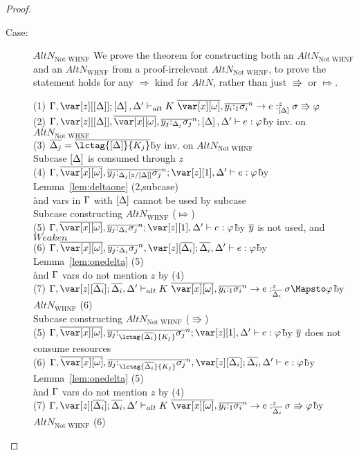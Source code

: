 \begin{proof}
\begin{description}
\item[Case:] $AltN_{\textrm{Not WHNF}}$
    We prove the theorem for constructing both an $AltN_{\textrm{Not WHNF}}$
        and an $AltN_{\textrm{WHNF}}$ from a proof-irrelevant $AltN_{\textrm{Not
        WHNF}}$, to prove the statement holds for any $\Rightarrow$ kind for
        $AltN$, rather than just $\Rrightarrow$ or $\Mapsto$.
\begin{tabbing}
    (1) $\G, \z[\irr{\D}]; \irr{\D}, \D' \vdash_{alt} K~\ov{\xo},\ov{y_i{:}_{1}\s_i}^n\to e :^z_{\irr{\D}} \s \Rrightarrow \vp$\\
    (2) $\G,\z[\irr{\D}],\ov{\xo},\ov{y_j{:}_{\D_j}\s_j}^n; \irr{\D}, \D' \vdash e : \vp$\`by inv. on $AltN_{\textrm{Not WHNF}}$\\
    (3) $\ov{\D_j} = \ov{\lctag{\irr{\D}}{K_j}}$\`by inv. on $AltN_{\textrm{Not WHNF}}$\\
    Subcase $\left[\Delta\right]$ is consumed through $z$\\
    (4) $\G,\ov{\xo},\ov{y_j{:}_{\D_j[z/\irr{\D}]}\s_j}^n; \z[1], \D' \vdash e : \vp$\`by Lemma~\ref{lem:deltaone} (2,subcase)\\\`and vars in $\Gamma$ with $\left[\Delta\right]$ cannot be used by subcase\\
    Subcase constructing $AltN_{\textrm{WHNF}}$ ($\Mapsto$)\\
    (5) $\G,\ov{\xo},\ov{y_j{:}_{\D_i}\s_j}^n; \z[1], \D' \vdash e : \vp$\`by $\overline{y}$ is not used, and $Weaken$\\
    (6) $\G,\ov{\xo},\ov{y_j{:}_{\D_i}\s_j}^n, \z[\ov{\D_i}]; \ov{\D_i}, \D' \vdash e : \vp$\`by Lemma~\ref{lem:onedelta} (5)\\\` and $\Gamma$ vars do not mention $z$ by (4) \\
    (7) $\G, \z[\ov{\D_i}]; \ov{\D_i}, \D' \vdash_{alt} K~\ov{\xo},\ov{y_i{:}_{1}\s_i}^n \to e :^z_{\ov{\D_i}} \s \Mapsto \vp$\`by $AltN_{\textrm{WHNF}}$ (6)\\
    Subcase constructing $AltN_{\textrm{Not WHNF}}$ ($\Rrightarrow$)\\
    (5) $\G,\ov{\xo},\ov{y_j{:}_{\lctag{\ov{\D_i}}{K_j}}\s_j}^n; \z[1], \D' \vdash e : \vp$\`by $\overline{y}$ does not consume resources\\
    (6) $\G,\ov{\xo},\ov{y_j{:}_{\lctag{\ov{\D_i}}{K_j}}\s_j}^n, \z[\ov{\D_i}]; \ov{\D_i}, \D' \vdash e : \vp$\`by Lemma~\ref{lem:onedelta} (5)\\\` and $\Gamma$ vars do not mention $z$ by (4) \\
    (7) $\G, \z[\ov{\D_i}]; \ov{\D_i}, \D' \vdash_{alt} K~\ov{\xo},\ov{y_i{:}_{1}\s_i}^n \to e :^z_{\ov{\D_i}} \s \Rrightarrow \vp$\`by $AltN_{\textrm{Not WHNF}}$ (6)\\

\end{tabbing}
\end{description}
\end{proof}
